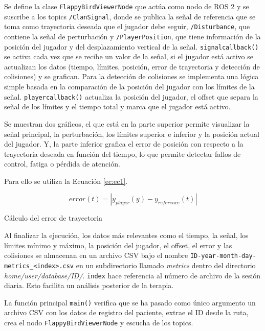 Se define la clase \verb|FlappyBirdViewerNode| que actúa como nodo de ROS 2 y se suscribe a los topics \verb|/ClanSignal|, donde se publica la señal de referencia que se toma como trayectoria deseada que el jugador debe seguir, \verb|/Disturbance|, que contiene la señal de perturbación y \verb|/PlayerPosition|, que tiene información de la posición del jugador y del desplazamiento vertical de la señal.
\verb|signalcallback()| se activa cada vez que se recibe un valor de la señal, si el jugador está activo se actualizan los datos (tiempo, límites, posición, error de trayectoria y detección de colisiones) y se grafican.
Para la detección de colisiones se implementa una lógica simple basada en la comparación de la posición del jugador con los límites de la señal.
\verb|playercallback()| actualiza la posición del jugador, el offset que separa la señal de los límites y el tiempo total y marca que el jugador está activo.

Se muestran dos gráficos, el que está en la parte superior permite visualizar la señal principal, la perturbación, los límites superior e inferior y la posición actual del jugador.
Y, la parte inferior grafica el error de posición con respecto a la trayectoria deseada en función del tiempo, lo que permite detectar fallos de control, fatiga o pérdida de atención.

Para ello se utiliza la Ecuación \ref{ec:ec1}.

\begin{myequation}[h]
\begin{equation}
error(t) = | y_{player}(y) - y_{reference}(t) |
\nonumber
\label{ec:ec1}
\end{equation}
\caption[Cálculo del error de trayectoria]{Cálculo del error de trayectoria}
\end{myequation}

Al finalizar la ejecución, los datos más relevantes como el tiempo, la señal, los límites mínimo y máximo, la posición del jugador, el offset, el error y las colisiones se almacenan en un archivo CSV bajo el nombre \verb|ID-year-month-day-metrics_<index>.csv| en un subdirectorio llamado \textit{metrics} dentro del directorio \textit{home/user/database/ID/}.
\verb|index| hace referencia al número de archivo de la sesión diaria.
Esto facilita un análisis posterior de la terapia.

La función principal \verb|main()| verifica que se ha pasado como único argumento un archivo CSV con los datos de registro del paciente, extrae el ID desde la ruta, crea el nodo \verb|FlappyBirdViewerNode| y escucha de los topics.

